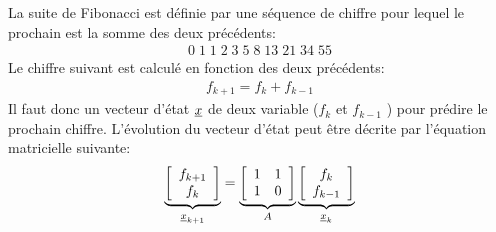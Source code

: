 La suite de Fibonacci est définie par une séquence de chiffre pour lequel le prochain est la somme des deux précédents:
\begin{align}
	0 \; 1\;1\;2\;3\;5\;8\;13\;21\;34\;55
\end{align}
Le chiffre suivant est calculé en fonction des deux précédents:
\begin{align}
	f_{k+1} = f_{k} + f_{k-1}
\end{align}
Il faut donc un vecteur d'état $\underline{x}$ de deux variable ($f_{k}$ et $f_{k-1}$ ) pour prédire le prochain chiffre. L'évolution du vecteur d'état peut être décrite par l'équation matricielle suivante:
\begin{align}
	\underbrace{
		\left[ \begin{array}{c}
				   f_{k+1} \\ f_{k}
		\end{array} \right]
	}_{\underline{x}_{k+1}}
	=
	\underbrace{
		\left[ \begin{array}{c c}
				   1 & 1 \\ 1 & 0
		\end{array} \right]
	}_{A}
	\underbrace{
		\left[ \begin{array}{c}
				   f_{k} \\ f_{k-1}
		\end{array} \right]
	}_{\underline{x}_{k}}
\end{align}

